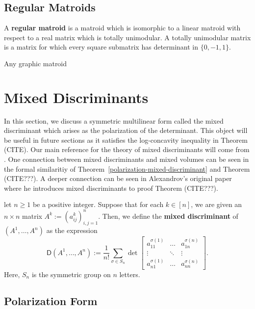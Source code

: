 \documentclass{puthesis-UG}
\begin{document}
\subsection{Regular Matroids}

\begin{defn}
	A \textbf{regular matroid} is a matroid which is isomorphic to a linear matroid with respect to a real matrix which is totally unimodular. A totally unimodular matrix is a matrix for which every square submatrix has determinant in $\{0, -1, 1\}$. 
\end{defn}

\begin{prop}
	Any graphic matroid
\end{prop}
\section{Mixed Discriminants}

In this section, we discuss a symmetric multilinear form called the mixed discriminant which arises as the polarization of the determinant. This object will be useful in future sections as it satisfies the log-concavity inequality in Theorem (CITE). Our main reference for the theory of mixed discriminants will come from \cite{bapat_raghavan_1997}. One connection between mixed discriminants and mixed volumes can be seen in the formal similaritiy of Theorem~\ref{polarization-mixed-discriminant} and Theorem (CITE???). A deeper connection can be seen in Alexandrov's original paper \cite{aleksandrov} where he introduces mixed discriminants to proof Theorem (CITE???). 

\begin{defn}
	let $n \geq 1$ be a positive integer. Suppose that for each $k \in [n]$, we are given an $n \times n$ matrix $A^k := (a_{ij}^k)_{i, j = 1}^n$. Then, we define the \textbf{mixed discriminant} of $(A^1, \ldots, A^n)$ as the expression 
	\[
		\mathsf{D}(A^1, \ldots, A^n) := \frac{1}{n!} \sum_{\sigma \in S_n} 
		\det 
		\begin{bmatrix} 
			a_{11}^{\sigma(1)} & \ldots & a_{1n}^{\sigma(n)} \\
			\vdots & \ddots & \vdots \\
			a_{n1}^{\sigma(1)} & \ldots & a_{nn}^{\sigma(n)}
		\end{bmatrix}.
	\]
	Here, $S_n$ is the symmetric group on $n$ letters. 
\end{defn}

\subsection{Polarization Form}
\end{document}
